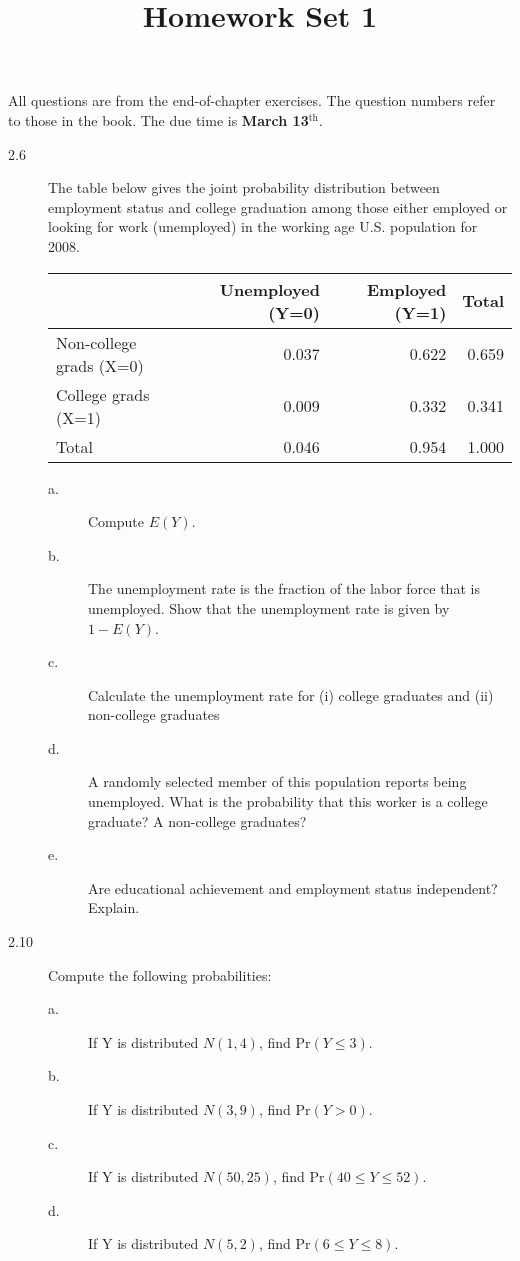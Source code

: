 \documentclass[a4paper,11pt]{article}
\date{}
\title{Homework Set 1}
\newcommand{\pr}{\mathrm{Pr}}
\begin{document}
\maketitle
All questions are from the end-of-chapter exercises. The question
numbers refer to those in the book. The due time is \textbf{March 13\(^{\text{th}}\)}.

\begin{description}
\item[{2.6}] The table below gives the joint probability distribution
between employment status and college graduation among those
either employed or looking for work (unemployed) in the
working age U.S. population for 2008.

\begin{center}
\begin{tabular}{lrrr}
 & Unemployed (Y=0) & Employed (Y=1) & Total\\
\hline
Non-college grads (X=0) & 0.037 & 0.622 & 0.659\\
College grads (X=1) & 0.009 & 0.332 & 0.341\\
\hline
Total & 0.046 & 0.954 & 1.000\\
\end{tabular}
\end{center}

\begin{description}
\item[{a.}] Compute \(E(Y)\).
\item[{b.}] The unemployment rate is the fraction of the labor force that is
unemployed. Show that the unemployment rate is given by \(1-E(Y)\).
\item[{c.}] Calculate the unemployment rate for (i) college graduates and (ii)
non-college graduates
\item[{d.}] A randomly selected member of this population reports being
unemployed. What is the probability that this worker is a college
graduate? A non-college graduates?
\item[{e.}] Are educational achievement and employment status independent?
Explain.
\end{description}
\end{description}


\begin{description}
\item[{2.10}] Compute the following probabilities:
\begin{description}
\item[{a.}] If Y is distributed \(N(1, 4)\), find \(\pr(Y \leq 3)\).
\item[{b.}] If Y is distributed \(N(3, 9)\), find \(\pr(Y > 0)\).
\item[{c.}] If Y is distributed \(N(50, 25)\), find \(\pr(40 \leq Y \leq 52)\).
\item[{d.}] If Y is distributed \(N(5, 2)\), find \(\pr(6 \leq Y \leq 8)\).
\end{description}
\end{description}
\end{document}
